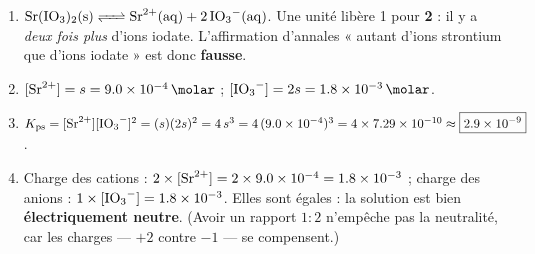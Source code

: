 \documentclass[11pt,a4paper]{article}
\newcommand{\Kps}{K_{\mathrm{ps}}}
\begin{document}
\begin{correction}
\begin{enumerate}[label=\textbf{\alph*)},leftmargin=2.2em,topsep=2pt,itemsep=2pt]
  \item $\ce{Sr(IO3)2(s) <=> Sr^{2+}(aq) + 2 IO3-(aq)}$. Une unité libère 1  pour
        \textbf{2}  : il y a \emph{deux fois plus} d'ions iodate. L'affirmation d'annales
        « autant d'ions strontium que d'ions iodate » est donc \textbf{fausse}.
  \item $[\ce{Sr^2+}]=s=\qty{9{,}0e-4}{\molar}$ ; $[\ce{IO3-}]=2s=\qty{1{,}8e-3}{\molar}$.
  \item $\Kps=[\ce{Sr^2+}][\ce{IO3-}]^{2}=(s)(2s)^{2}=4\,s^{3}
        =4\,(\num{9{,}0e-4})^{3}=4\times\num{7{,}29e-10}\approx\boxed{\num{2{,}9e-9}}$.
  \item Charge des cations : $2\times[\ce{Sr^2+}]=2\times\num{9{,}0e-4}=\num{1{,}8e-3}$ ;
        charge des anions : $1\times[\ce{IO3-}]=\num{1{,}8e-3}$. Elles sont égales : la solution est bien
        \textbf{électriquement neutre}. (Avoir un rapport $1{:}2$ n'empêche pas la neutralité, car les
        charges — $+2$ contre $-1$ — se compensent.)
\end{enumerate}
\end{correction}
\end{document}
